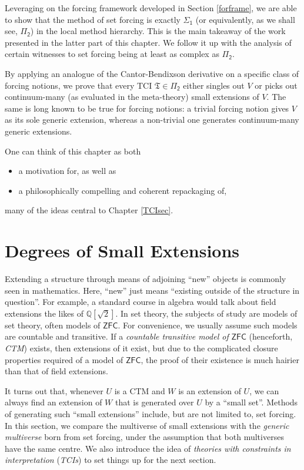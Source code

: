 \documentclass[12pt, twoside]{memoir}
\numberwithin{equation}{section}
\theoremstyle{definition}
\theoremstyle{remark}
\theoremstyle{definition}
\theoremstyle{definition}
\theoremstyle{definition}
\theoremstyle{remark}
\begin{document}
Leveraging on the forcing framework developed in Section \ref{forframe}, we are able to show that the method of set forcing is exactly $\mathsf{\Sigma_1}$ (or equivalently, as we shall see, $\mathsf{\Pi_2}$) in the local method hierarchy. This is the main takeaway of the work presented in the latter part of this chapter. We follow it up with the analysis of certain witnesses to set forcing being at least as complex as $\mathsf{\Pi_2}$.

By applying an analogue of the Cantor-Bendixson derivative on a specific class of forcing notions, we prove that every TCI $\mathfrak{T} \in \mathsf{\Pi_2}$ either singles out $V$ or picks out continuum-many (as evaluated in the meta-theory) small extensions of $V$. The same is long known to be true for forcing notions: a trivial forcing notion gives $V$ as its sole generic extension, whereas a non-trivial one generates continuum-many generic extensions.

One can think of this chapter as both 
\begin{itemize}
    \item a motivation for, as well as 
    \item a philosophically compelling and coherent repackaging of, 
\end{itemize}
many of the ideas central to Chapter \ref{TCIsec}. 

\section{Degrees of Small Extensions}\label{sect3}

Extending a structure through means of adjoining ``new'' objects is commonly seen in mathematics. Here, ``new'' just means ``existing outside of the structure in question''. For example, a standard course in algebra would talk about field extensions the likes of $\mathbb{Q}[\sqrt{2}]$. In set theory, the subjects of study are models of set theory, often models of $\mathsf{ZFC}$. For convenience, we usually assume such models are countable and transitive. If a \emph{countable transitive model of} $\mathsf{ZFC}$ (henceforth, \emph{CTM}) exists, then extensions of it exist, but due to the complicated closure properties required of a model of $\mathsf{ZFC}$, the proof of their existence is much hairier than that of field extensions. 

It turns out that, whenever $U$ is a CTM and $W$ is an extension of $U$, we can always find an extension of $W$ that is generated over $U$ by a ``small set''. Methods of generating such ``small extensions'' include, but are not limited to, set forcing. In this section, we compare the multiverse of small extensions with the \emph{generic multiverse} born from set forcing, under the assumption that both multiverses have the same centre. We also introduce the idea of \emph{theories with constraints in interpretation} (\emph{TCIs}) to set things up for the next section. 
\end{document}
